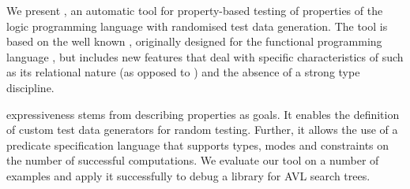 

We present \plqc{}, an automatic tool for property-based
testing of properties of the logic programming language \Prolog{} with
randomised test data generation.
%
The tool is based on the well known \QuickCheck, originally designed
for the functional programming language \Haskell{}, but includes new
features that deal with specific characteristics of \Prolog{} such as
its relational nature (as opposed to \Haskell{}) and the absence
of a strong type discipline.


\plqc{} expressiveness stems from describing properties as
\Prolog{} goals.
%
It enables the definition of custom test data generators for
random testing.
%
Further, it allows the use of a predicate specification language that
supports types, modes and constraints on the number of successful
computations.
%
We evaluate our tool on a number of  examples and apply
it successfully to debug a \Prolog{} library for AVL search trees.

